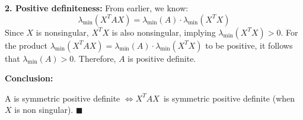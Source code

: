 \documentclass[aspectratio=169]{beamer}
\begin{document}
\begin{frame}
\textbf{2. Positive definiteness:  }
   From earlier, we know:
   \[
   \lambda_{\min}(X^T A X) = \lambda_{\min}(A) \cdot \lambda_{\min}(X^T X)
   \]
   Since \( X \) is nonsingular, \( X^T X \) is also nonsingular, implying \( \lambda_{\min}(X^T X) > 0 \).  
   For the product \( \lambda_{\min}(X^T A X) = \lambda_{\min}(A) \cdot \lambda_{\min}(X^T X) \) to be positive, it follows that \( \lambda_{\min}(A) > 0 \).  
   Therefore, \( A \) is positive definite.



\bigskip

\textbf{Conclusion:}


A is symmetric positive definite \( \iff  X^TAX \)\ is symmetric positive definite (when \( X \) is non singular).
\hfill \(\blacksquare\)
\end{frame}
\end{document}
